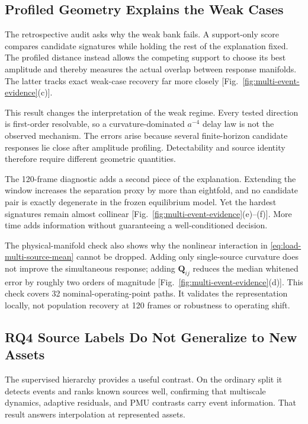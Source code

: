 \subsection{Profiled Geometry Explains the Weak Cases}

The retrospective audit asks why the weak bank fails. A support-only score compares candidate signatures while holding the rest of the explanation fixed. The profiled distance instead allows the competing support to choose its best amplitude and thereby measures the actual overlap between response manifolds. The latter tracks exact weak-case recovery far more closely [Fig.~\ref{fig:multi-event-evidence}(c)].

This result changes the interpretation of the weak regime. Every tested direction is first-order resolvable, so a curvature-dominated $a^{-4}$ delay law is not the observed mechanism. The errors arise because several finite-horizon candidate responses lie close after amplitude profiling. Detectability and source identity therefore require different geometric quantities.

The 120-frame diagnostic adds a second piece of the explanation. Extending the window increases the separation proxy by more than eightfold, and no candidate pair is exactly degenerate in the frozen equilibrium model. Yet the hardest signatures remain almost collinear [Fig.~\ref{fig:multi-event-evidence}(e)--(f)]. More time adds information without guaranteeing a well-conditioned decision.

The physical-manifold check also shows why the nonlinear interaction in \eqref{eq:load-multi-source-mean} cannot be dropped. Adding only single-source curvature does not improve the simultaneous response; adding $\bm Q_{ij}$ reduces the median whitened error by roughly two orders of magnitude [Fig.~\ref{fig:multi-event-evidence}(d)]. This check covers 32 nominal-operating-point paths. It validates the representation locally, not population recovery at 120 frames or robustness to operating shift.

\subsection{RQ4 Source Labels Do Not Generalize to New Assets}

The supervised hierarchy provides a useful contrast. On the ordinary split it detects events and ranks known sources well, confirming that multiscale dynamics, adaptive residuals, and PMU contrasts carry event information. That result answers interpolation at represented assets.

